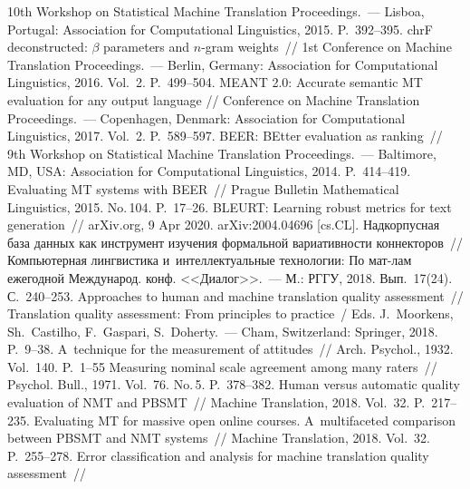 \begin{multicols}{2}
{{\begin{thebibliography}{99}
10th Workshop on Statistical Machine Translation Proceedings.~--- Lisboa, Portugal: Association for 
Computational Linguistics, 2015. P.~392--395.
 chrF deconstructed: $\beta$ parameters and \mbox{$n$-gram} weights~// 
1st Conference on Machine Translation Proceedings.~--- Berlin, Germany: Association for Computational 
Linguistics, 2016. Vol.~2. P.~499--504.
 MEANT 2.0: Accurate semantic MT evaluation for any output language // 
Conference on Machine Translation Proceedings.~---
 Copenhagen, Denmark: Association for Computational Linguistics, 2017. Vol.~2. P.~589--597.
 BEER: BEtter evaluation as ranking~//  
9th Workshop on Statistical Machine Translation Proceedings.~--- Baltimore, MD, USA: Association for 
Computational Linguistics, 2014. P.~414--419.
 Evaluating MT systems with BEER~// Prague Bulletin  
Mathematical Linguistics, 2015. No.\,104. P.~17--26.
 BLEURT: Learning robust metrics for text generation~// 
arXiv.org, 9 Apr 2020. arXiv:2004.04696 [cs.CL].
 Надкорпусная база данных как инструмент изучения формальной 
вариативности коннекторов~// Компьютерная лингвистика и~интеллектуальные 
технологии: По мат-лам ежегодной \mbox{Международ.} конф. <<Диалог>>.~---
 М.: РГГУ, 2018. Вып.~17(24). С.~240--253.
 Approaches to human and machine 
translation quality assessment~// Translation quality assessment: From principles to practice~/ 
Eds. J.~Moorkens, Sh.~Castilho, F.~Gaspari, S.~Doherty.~--- Cham, Switzerland: Springer, 2018.  P.~9--38.
 A~technique for the measurement of attitudes~// Arch. Psychol., 1932. 
Vol.~140. P.~1--55
 Measuring nominal scale agreement among many raters~// Psychol. Bull., 1971. 
Vol.~76. No.\,5. P.~378--382.
 Human versus automatic quality evaluation of 
NMT and PBSMT~// Machine Translation, 2018. Vol.~32. P.~217--235.
 Evaluating MT for massive open online 
courses. A~multifaceted comparison between PBSMT and NMT systems~// Machine Translation, 
2018. Vol.~32. P.~255--278.
 Error classification and analysis for machine translation quality assessment~// 

\end{thebibliography}}}
\end{multicols}
